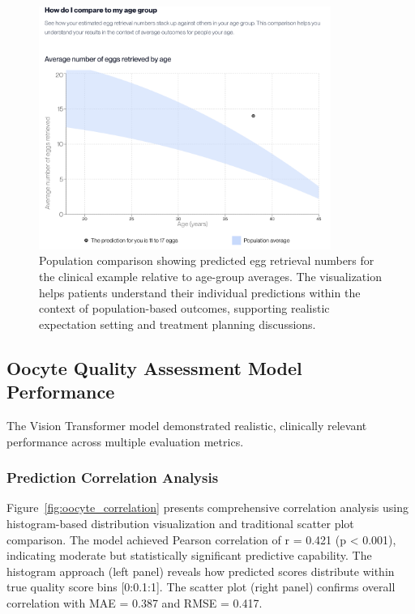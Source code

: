 \begin{figure}[H]
    \centering
    \includegraphics[width=0.85\textwidth]{figures/AgeGroup.png}
    \caption{Population comparison showing predicted egg retrieval numbers for the clinical example relative to age-group averages. The visualization helps patients understand their individual predictions within the context of population-based outcomes, supporting realistic expectation setting and treatment planning discussions.}
    \label{fig:age_comparison}
\end{figure}

\subsection{Oocyte Quality Assessment Model Performance}

The Vision Transformer model demonstrated realistic, clinically relevant performance across multiple evaluation metrics.

\subsubsection{Prediction Correlation Analysis}

Figure~\ref{fig:oocyte_correlation} presents comprehensive correlation analysis using histogram-based distribution visualization and traditional scatter plot comparison. The model achieved Pearson correlation of r = 0.421 (p < 0.001), indicating moderate but statistically significant predictive capability. The histogram approach (left panel) reveals how predicted scores distribute within true quality score bins [0:0.1:1]. The scatter plot (right panel) confirms overall correlation with MAE = 0.387 and RMSE = 0.417.

